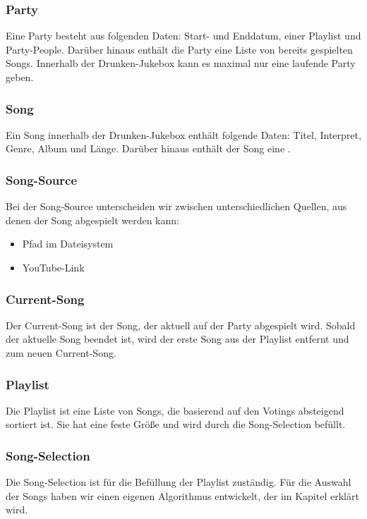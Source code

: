 \subsubsection{Party}
Eine Party besteht aus folgenden Daten: Start- und Enddatum, einer Playlist und Party-People. Darüber hinaus enthält die Party eine Liste von bereits gespielten Songs. Innerhalb der Drunken-Jukebox kann es maximal nur eine laufende Party geben.

\subsubsection{Song}
\label{sec:Song}
Ein Song innerhalb der Drunken-Jukebox enthält folgende Daten: Titel, Interpret, Genre, Album und Länge. Darüber hinaus enthält der Song eine .

\subsubsection{Song-Source}
\label{sec:SongSource}

Bei der Song-Source unterscheiden wir zwischen unterschiedlichen Quellen, aus denen der Song abgespielt werden kann:
\begin{itemize}
	\item Pfad im Dateisystem 
	\item YouTube-Link
\end{itemize}

\subsubsection{Current-Song}
Der Current-Song ist der Song, der aktuell auf der Party abgespielt wird. Sobald der aktuelle Song beendet ist, wird der erste Song aus der Playlist entfernt und zum neuen Current-Song. 

\subsubsection{Playlist}
Die Playlist ist eine Liste von Songs, die basierend auf den Votings absteigend sortiert ist. Sie hat eine feste Größe und wird durch die Song-Selection befüllt.

\subsubsection{Song-Selection}
Die Song-Selection ist für die Befüllung der Playlist zuständig. Für die Auswahl der Songs haben wir einen eigenen Algorithmus entwickelt, der im Kapitel  erklärt wird.

